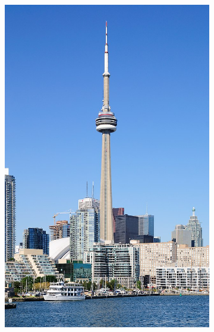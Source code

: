 \documentclass[%
reprint,
twocolumn,
nofootinbib,
 amsmath,amssymb,
 aps,
]{revtex4-2}
\begin{document}
\begin{figure}[H]
    \begin{subfigure}{0.23\textwidth}
        \includegraphics[width=0.98\linewidth]{img/Toronto_-_ON_-_Toronto_Harbourfront7.jpg}
    \end{subfigure}
    \begin{subfigure}{0.23\textwidth}

\end{subfigure}
\end{figure}
\end{document}
